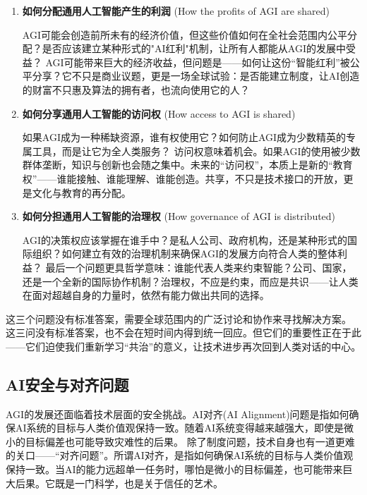 \begin{enumerate}
\item {\bf 如何分配通用人工智能产生的利润} (How the profits of AGI are shared)

AGI可能会创造前所未有的经济价值，但这些价值如何在全社会范围内公平分配？是否应该建立某种形式的"AI红利"机制，让所有人都能从AGI的发展中受益？
AGI可能带来巨大的经济收益，但问题是——如何让这份“智能红利”被公平分享？它不只是商业议题，更是一场全球试验：是否能建立制度，让AI创造的财富不只惠及算法的拥有者，也流向使用它的人？

\item {\bf 如何分享通用人工智能的访问权} (How access to AGI is shared)

如果AGI成为一种稀缺资源，谁有权使用它？如何防止AGI成为少数精英的专属工具，而是让它为全人类服务？
访问权意味着机会。如果AGI的使用被少数群体垄断，知识与创新也会随之集中。未来的“访问权”，本质上是新的“教育权”——谁能接触、谁能理解、谁能创造。共享，不只是技术接口的开放，更是文化与教育的再分配。

\item {\bf 如何分担通用人工智能的治理权} (How governance of AGI is distributed)

AGI的决策权应该掌握在谁手中？是私人公司、政府机构，还是某种形式的国际组织？如何建立有效的治理机制来确保AGI的发展方向符合人类的整体利益？
最后一个问题更具哲学意味：谁能代表人类来约束智能？公司、国家，还是一个全新的国际协作机制？治理权，不应是约束，而应是共识——让人类在面对超越自身的力量时，依然有能力做出共同的选择。
\end{enumerate}

这三个问题没有标准答案，需要全球范围内的广泛讨论和协作来寻找解决方案。
这三问没有标准答案，也不会在短时间内得到统一回应。但它们的重要性正在于此——它们迫使我们重新学习“共治”的意义，让技术进步再次回到人类对话的中心。

\subsection{AI安全与对齐问题}

AGI的发展还面临着技术层面的安全挑战。AI对齐(AI Alignment)问题是指如何确保AI系统的目标与人类价值观保持一致。随着AI系统变得越来越强大，即使是微小的目标偏差也可能导致灾难性的后果。
除了制度问题，技术自身也有一道更难的关口——“对齐问题”。所谓AI对齐，是指如何确保AI系统的目标与人类价值观保持一致。当AI的能力远超单一任务时，哪怕是微小的目标偏差，也可能带来巨大后果。它既是一门科学，也是关于信任的艺术。

